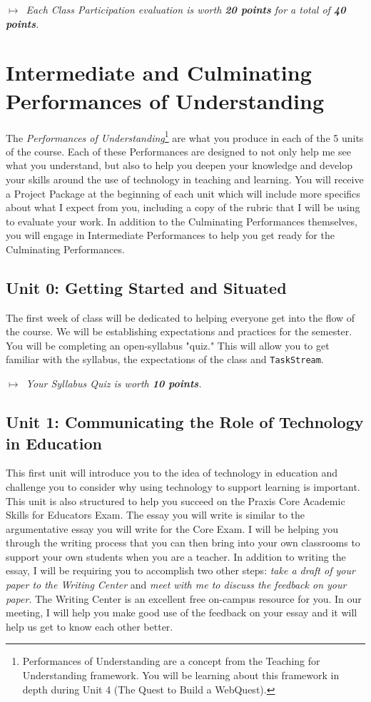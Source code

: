 \documentclass{tufte-handout}
\begin{document}
\medskip\noindent\textit{$\mapsto$~Each Class Participation evaluation is worth \textbf{20 points} for a total of \textbf{40 points}.}

\section{Intermediate and Culminating Performances of Understanding}

The \textit{Performances of Understanding}\footnote{Performances of Understanding are a concept from the Teaching for Understanding framework. You will be learning about this framework in depth during Unit 4 (The Quest to Build a WebQuest).} are what you produce in each of the 5 units of the course. Each of these Performances are designed to not only help me see what you understand, but also to help you deepen your knowledge and develop your skills around the use of technology in teaching and learning. You will receive a \textsf{Project Package} at the beginning of each unit which will include more specifics about what I expect from you, including a copy of the rubric that I will be using to evaluate your work. In addition to the Culminating Performances themselves, you will engage in Intermediate Performances to help you get ready for the Culminating Performances.

\subsection{Unit 0: Getting Started and Situated}

The first week of class will be dedicated to helping everyone get into the flow of the course. We will be establishing expectations and practices for the semester. You will be completing an open-syllabus "quiz." This will allow you to get familiar with the syllabus, the expectations of the class and \texttt{TaskStream}.

\medskip\noindent\textit{$\mapsto$~Your Syllabus Quiz is worth \textbf{10 points}.}


\subsection{Unit 1: Communicating the Role of Technology in Education}

This first unit will introduce you to the idea of technology in education and challenge you to consider why using technology to support learning is important. This unit is also structured to help you succeed on the Praxis Core Academic Skills for Educators Exam. The essay you will write is similar to the argumentative essay you will write for the Core Exam. I will be helping you through the writing process that you can then bring into your own classrooms to support your own students when you are a teacher. In addition to writing the essay, I will be requiring you to accomplish two other steps: \textit{take a draft of your paper to the Writing Center} and \textit{meet with me to discuss the feedback on your paper}. The Writing Center is an excellent free on-campus resource for you. In our meeting, I will help you make good use of the feedback on your essay and it will help us get to know each other better.
\end{document}
